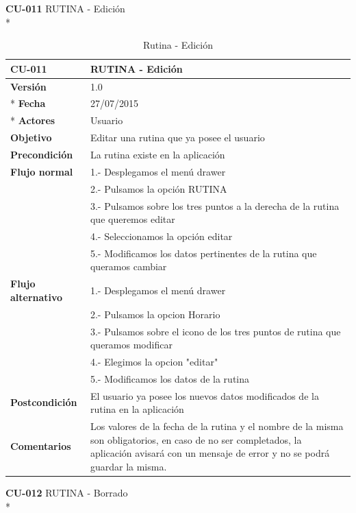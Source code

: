 \documentclass[../pfc.tex]{subfiles}
\begin{document}
		
	\textbf{CU-011}	RUTINA - Edición\\*
		
		\begin{table}[H]
			\centering
			\begin{tabular}[t]{|p{3cm}|p{9.5cm}|}
				\hline \textbf{CU-011} & \textbf{RUTINA - Edición} \\*
				\hline\hline \textbf{Versión} & 1.0 \\ *
				\hline\hline \textbf{Fecha} & 27/07/2015 \\ *
				\hline\textbf{Actores} 	& Usuario\\*
				\hline \textbf{Objetivo} & Editar una rutina que ya posee el usuario\\* 			
				\hline \textbf{Precondición} & La rutina existe en la aplicación\\* 
				\hline \textbf{Flujo normal} & 1.- Desplegamos el menú drawer \\* 
				& 2.- Pulsamos la opción RUTINA\\*	
				& 3.- Pulsamos sobre los tres puntos a la derecha de la rutina que queremos editar\\*	
				& 4.- Seleccionamos la opción editar\\*	
				& 5.- Modificamos los datos pertinentes de la rutina que queramos cambiar\\*	
				\hline \textbf{Flujo alternativo} & 1.- Desplegamos el menú drawer \\* 
				& 2.- Pulsamos la opcion Horario \\*	
				& 3.- Pulsamos sobre el icono de los tres puntos de rutina que queramos modificar \\*	
				& 4.- Elegimos la opcion "editar"\\*	
				& 5.- Modificamos los datos de la rutina\\*	
				\hline \textbf{Postcondición} & El usuario ya posee los nuevos datos modificados de la rutina en la aplicación \\* 
				\hline \textbf{Comentarios}   & Los valores de la fecha de la rutina y el nombre de la misma son obligatorios, en caso de no ser completados, la aplicación avisará con un mensaje de error y no se podrá guardar la misma.\\*
				\hline
			\end{tabular}
			\caption{Rutina - Edición}
			\label{tabla:caso011}
		\end{table}
		
		
		
	\textbf{CU-012}	RUTINA - Borrado\\*
		
\end{document}
